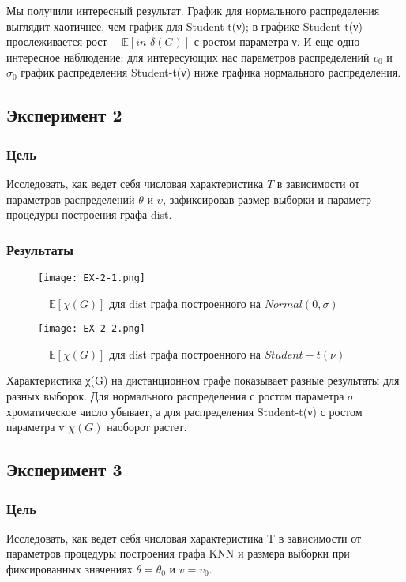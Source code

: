 \documentclass[a4paper, 12pt]{article}
\begin{document}
Мы получили интересный результат. График для нормального распределения выглядит хаотичнее, чем график для Student-t(ν); в графике Student-t(ν) прослеживается рост $\quad \mathbb{E}[in\_\delta(G)]$ с ростом параметра ν. И еще одно интересное наблюдение: для интересующих нас параметров распределений $v_0$ и $σ_0$ график распределения Student-t(ν) ниже графика нормального распределения.\\

\newpage
\subsection{Эксперимент 2}
\subsubsection{Цель}
Исследовать, как ведет себя числовая характеристика $T$ в зависимости
от параметров распределений $θ$ и $υ$, зафиксировав размер выборки и
параметр процедуры построения графа dist.\\

\subsubsection{Результаты}

\begin{figure}[H]
    \centering
    \texttt{[image: EX-2-1.png]}
    \caption{$\quad \mathbb{E}[\chi(G)]$ для dist графа построенного на $Normal(0,\sigma)$}
    \label{fig:uml}
\end{figure}

\begin{figure}[H]
    \centering
    \texttt{[image: EX-2-2.png]}
    \caption{$\quad \mathbb{E}[\chi(G)]$ для dist графа построенного на $Student-t(ν)$}
    \label{fig:uml}
\end{figure}

Характеристика χ(G) на дистанционном графе показывает разные результаты для разных выборок. Для нормального распределения с ростом параметра $\sigma$ хроматическое число убывает, а для распределения Student-t(ν) с ростом параметра v $\chi(G)$ наоборот растет.\\

\newpage

\subsection{Эксперимент 3}
\subsubsection{Цель}
Исследовать, как ведет себя числовая характеристика T в зависимости
от параметров процедуры построения графа KNN и размера выборки при
фиксированных значениях $\theta = \theta_0$ и $v = v_0$.\\
\end{document}
